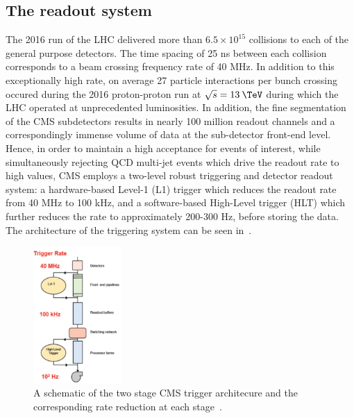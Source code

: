 \subsection{The readout system}
\label{subsec:readout}

The 2016 run of the LHC delivered more than $6.5 \times 10^{15}$ collisions to each of the general purpose detectors. The time spacing of 25 ns between each collision corresponds to a beam crossing frequency rate of 40 MHz. In addition to this exceptionally high rate, on average 27 particle interactions per bunch crossing occured during the 2016 proton-proton run at $\sqrt{s}=13\:\TeV$ during which the LHC operated at unprecedented luminosities. In addition, the fine segmentation of the CMS subdetectors results in nearly 100 million readout channels and a correspondingly immense volume of data at the sub-detector front-end level. Hence, in order to maintain a high acceptance for events of interest, while simultaneously rejecting QCD multi-jet events which drive the readout rate to high values,  CMS employs a two-level robust triggering and detector readout system: a hardware-based Level-1 (L1) trigger which reduces the readout rate from 40 MHz to 100 kHz, and a software-based High-Level trigger (HLT) which further reduces the rate to approximately 200-300 Hz, before storing the data. The architecture of the triggering system can be seen in~.

\begin{figure}
  \centering
  \includegraphics[width=0.3\textwidth]{figs/TriggerRate}
  \caption{A schematic of the two stage CMS trigger architecure and the corresponding rate reduction at each stage~\cite{Halyo:2013iba}.}
  \label{fig:trigger}
\end{figure}

